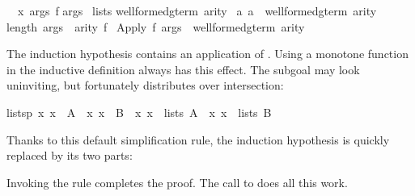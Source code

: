 \begin{isabellebody}
\begin{isamarkuptxt}
\begin{isabelle}
\ {}{\isachardot}\ {\isasymAnd}x\ args\ f{\isachardot}\isanewline
{}args\isanewline
{}\ lists\isanewline
{}well{\isacharunderscore}formed{\isacharunderscore}gterm{\isacharprime}\ arity\ {\isasyminter}\isanewline
{}a{\isachardot}\ a\ {\isasymin}\ well{\isacharunderscore}formed{\isacharunderscore}gterm\ arity{\isacharbraceright}{\isacharparenright}{\isacharsemicolon}\isanewline
{}length\ args\ {\isacharequal}\ arity\ f{\isasymrbrakk}\isanewline
{}\ Apply\ f\ args\ {\isasymin}\ well{\isacharunderscore}formed{\isacharunderscore}gterm\ arity%
\end{isabelle}
The induction hypothesis contains an application of .  Using a
monotone function in the inductive definition always has this effect.  The
subgoal may look uninviting, but fortunately 
 distributes over intersection:
\begin{isabelle}%
listsp\ {\isacharparenleft}{\isacharparenleft}{\isasymlambda}x{\isachardot}\ x\ {\isasymin}\ A{\isacharparenright}\ {\isasyminter}\ {\isacharparenleft}{\isasymlambda}x{\isachardot}\ x\ {\isasymin}\ B{\isacharparenright}{\isacharparenright}\ {\isacharequal}\ {\isacharparenleft}{\isasymlambda}x{\isachardot}\ x\ {\isasymin}\ lists\ A{\isacharparenright}\ {\isasyminter}\ {\isacharparenleft}{\isasymlambda}x{\isachardot}\ x\ {\isasymin}\ lists\ B{\isacharparenright}%
\end{isabelle}
Thanks to this default simplification rule, the induction hypothesis 
is quickly replaced by its two parts:
\begin{trivlist}
\item {}
\item {}
\end{trivlist}
Invoking the rule  completes the proof.  The
call to  does all this work.


\end{isamarkuptxt}
\end{isabellebody}
